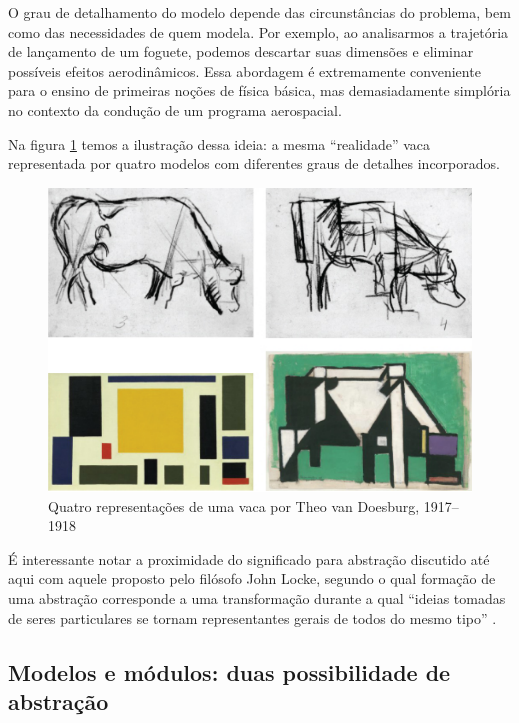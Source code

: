 O grau de detalhamento do modelo depende das circunstâncias do problema, bem como das necessidades de quem modela. Por exemplo, ao analisarmos a trajetória de lançamento de um foguete, podemos descartar suas dimensões e eliminar possíveis efeitos aerodinâmicos. Essa abordagem é extremamente conveniente para o ensino de primeiras noções de física básica, mas demasiadamente simplória no contexto da condução de um programa aerospacial.

Na figura \ref{fig:cows} temos a ilustração dessa ideia: a mesma ``realidade'' vaca representada por quatro modelos com diferentes graus de detalhes incorporados.

\begin{figure}[!htb]
	\caption{Quatro representações de uma vaca por Theo van Doesburg, 1917--1918}
	\begin{center}
	    \includegraphics[scale=0.26]{imagens/vacas.png}
	\end{center}
	\label{fig:cows}
\end{figure}

É interessante notar a proximidade do significado para abstração discutido até aqui com aquele proposto pelo filósofo John Locke, segundo o qual formação de uma abstração corresponde a uma transformação durante a qual ``ideias tomadas de seres particulares se tornam representantes gerais de todos do mesmo tipo'' .

\subsection{Modelos e módulos: duas possibilidade de abstração}

